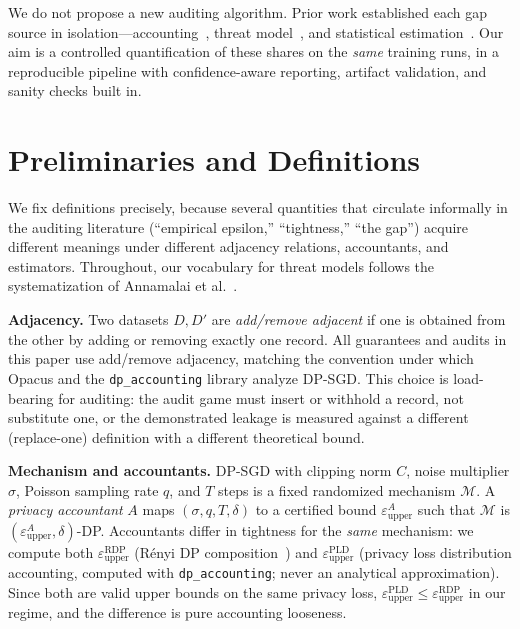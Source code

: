 \documentclass{article}
\begin{document}
We do not propose a new auditing algorithm. Prior work established each gap source in isolation---accounting~\citep{nasr2023tight}, threat model~\citep{nasr2021adversary,annamalai2024nearly}, and statistical estimation~\citep{zanella2023bayesian,askin2025fdp,koskela2025density}. Our aim is a controlled quantification of these shares on the \emph{same} training runs, in a reproducible pipeline with confidence-aware reporting, artifact validation, and sanity checks built in.

\section{Preliminaries and Definitions}
\label{sec:preliminaries}

We fix definitions precisely, because several quantities that circulate informally in the auditing literature (``empirical epsilon,'' ``tightness,'' ``the gap'') acquire different meanings under different adjacency relations, accountants, and estimators. Throughout, our vocabulary for threat models follows the systematization of Annamalai et al.~\citep{annamalai2026sok}.

\textbf{Adjacency.} Two datasets $D, D'$ are \emph{add/remove adjacent} if one is obtained from the other by adding or removing exactly one record. All guarantees and audits in this paper use add/remove adjacency, matching the convention under which Opacus and the \texttt{dp\_accounting} library analyze DP-SGD. This choice is load-bearing for auditing: the audit game must insert or withhold a record, not substitute one, or the demonstrated leakage is measured against a different (replace-one) definition with a different theoretical bound.

\textbf{Mechanism and accountants.} DP-SGD with clipping norm $C$, noise multiplier $\sigma$, Poisson sampling rate $q$, and $T$ steps is a fixed randomized mechanism $\mathcal{M}$. A \emph{privacy accountant} $A$ maps $(\sigma, q, T, \delta)$ to a certified bound $\varepsilon^{A}_{\text{upper}}$ such that $\mathcal{M}$ is $(\varepsilon^{A}_{\text{upper}}, \delta)$-DP. Accountants differ in tightness for the \emph{same} mechanism: we compute both $\varepsilon^{\text{RDP}}_{\text{upper}}$ (R\'{e}nyi DP composition~\citep{mironov2017renyi}) and $\varepsilon^{\text{PLD}}_{\text{upper}}$ (privacy loss distribution accounting, computed with \texttt{dp\_accounting}; never an analytical approximation). Since both are valid upper bounds on the same privacy loss, $\varepsilon^{\text{PLD}}_{\text{upper}} \le \varepsilon^{\text{RDP}}_{\text{upper}}$ in our regime, and the difference is pure accounting looseness.
\end{document}
